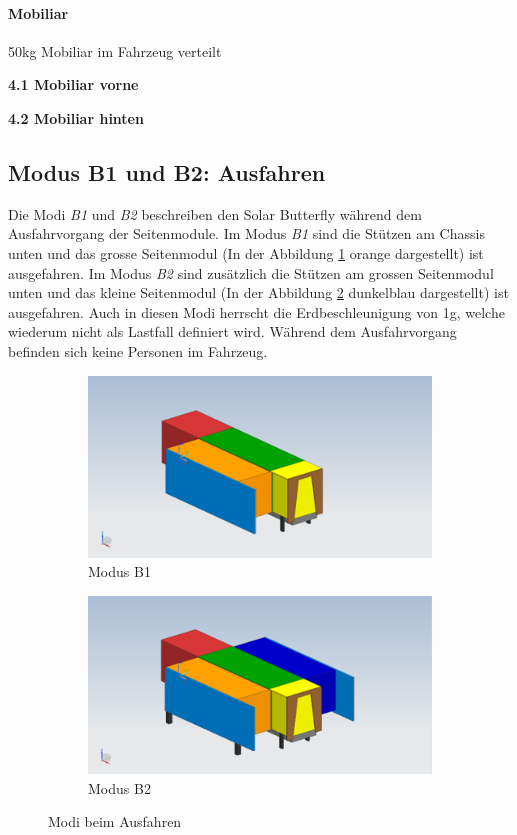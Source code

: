   \paragraph{Mobiliar}
  50kg Mobiliar im Fahrzeug verteilt
  \begin{description}
    \item \textbf{4.1 Mobiliar vorne}
    \item \textbf{4.2 Mobiliar hinten}
  \end{description}


\subsection{Modus B1 und B2: Ausfahren}
Die Modi \emph{B1} und \emph{B2} beschreiben den Solar Butterfly während dem Ausfahrvorgang der Seitenmodule. Im Modus \emph{B1} sind die Stützen am Chassis unten und das grosse Seitenmodul (In der Abbildung \ref{Modus B1} orange dargestellt) ist ausgefahren. Im Modus \emph{B2} sind zusätzlich die Stützen am grossen Seitenmodul unten und das kleine Seitenmodul (In der Abbildung \ref{Modus B2} dunkelblau dargestellt) ist ausgefahren. Auch in diesen Modi herrscht die Erdbeschleunigung von 1g, welche wiederum nicht als Lastfall definiert wird. Während dem Ausfahrvorgang befinden sich keine Personen im Fahrzeug.

\begin{figure}[!ht]
  \centering
    \begin{subfigure}{.5\textwidth}
      \centering
      \includegraphics[width=.9\linewidth]{04_figures/B1.png}
      \caption{Modus B1}
      \label{Modus B1}
    \end{subfigure}%
    \begin{subfigure}{.5\textwidth}
      \centering
      \includegraphics[width=.9\linewidth]{04_figures/B2.png}
      \caption{Modus B2}
      \label{Modus B2}
    \end{subfigure}
  \caption{Modi beim Ausfahren}
\label{Modi beim Ausfahren}
\end{figure}

